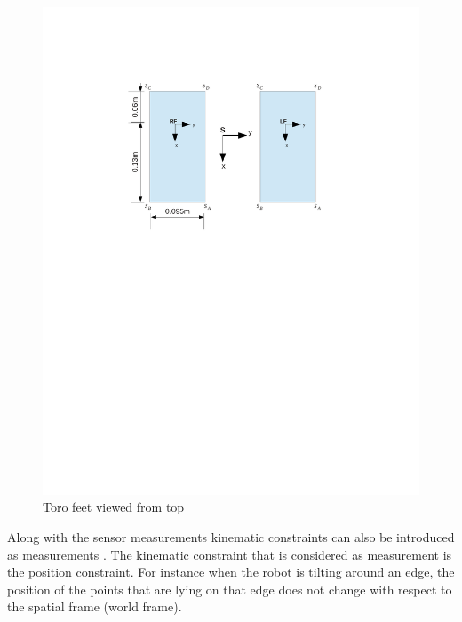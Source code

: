 \begin{figure}
    \begin{center}
    \includegraphics[trim= 20mm 150mm 20mm 50mm,scale=0.80]{Bilder/foot_topview.pdf}
    \caption{Toro feet viewed from top}
    \label{fig:biped_feet}
    \end{center}
\end{figure}
Along with the sensor measurements kinematic constraints can also be introduced as measurements \citep{atk12}. The kinematic constraint that is considered as measurement is the position constraint. For instance when the robot is tilting around an edge, the position of the points that are lying on that edge does not change with respect to the spatial frame (world frame). 
 
